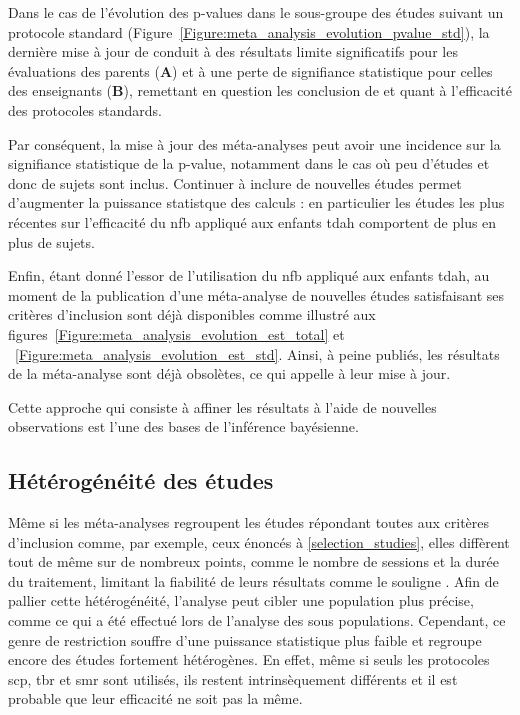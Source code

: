 Dans le cas de l'évolution des p-values dans le sous-groupe des études suivant un protocole standard (Figure~\ref{Figure:meta_analysis_evolution_pvalue_std}), la dernière mise à jour 
de \citet{Cortese2016} conduit à des résultats limite significatifs pour les évaluations des parents (\textbf{A}) et à une perte de signifiance statistique pour celles des 
enseignants (\textbf{B}), remettant en question les conclusion de \citet{Cortese2016} et \citet{Bussalb2019clinical} quant à l'efficacité des protocoles standards.

Par conséquent, la mise à jour des méta-analyses peut avoir une incidence sur la signifiance statistique de la p-value, notamment dans le cas où peu d'études et donc de sujets
sont inclus. Continuer à inclure de nouvelles études permet d'augmenter la puissance statistque des calculs : en particulier les études les plus récentes sur l'efficacité du \gls{nfb}
appliqué aux enfants \gls{tdah} comportent de plus en plus de sujets.

Enfin, étant donné l'essor de l'utilisation du \gls{nfb} appliqué aux enfants \gls{tdah}, au moment de la publication d'une méta-analyse de nouvelles études satisfaisant ses critères d'inclusion
sont déjà disponibles comme illustré aux figures~\ref{Figure:meta_analysis_evolution_est_total} et ~\ref{Figure:meta_analysis_evolution_est_std}. Ainsi, à peine publiés, les résultats de la 
méta-analyse sont déjà obsolètes, ce qui appelle à leur mise à jour. 

Cette approche qui consiste à affiner les résultats à l'aide de nouvelles observations est l'une des bases de l'inférence bayésienne.

\subsection{Hétérogénéité des études} 

Même si les méta-analyses regroupent les études répondant toutes aux critères d'inclusion comme, par exemple, ceux énoncés à \ref{selection_studies}, 
elles diffèrent tout de même sur de nombreux points, comme le nombre de sessions et la durée du traitement, limitant la fiabilité de leurs résultats 
comme le souligne \citep{Alkoby2017}. Afin de pallier 
cette hétérogénéité, l'analyse peut cibler une population plus précise, comme ce qui a été effectué lors de l'analyse
des sous populations. Cependant, ce genre de restriction souffre d'une puissance statistique plus faible et regroupe encore des études fortement hétérogènes.
En effet, même si seuls les protocoles \gls{scp}, \gls{tbr} et \gls{smr} sont utilisés, ils restent intrinsèquement différents et il est probable que leur
efficacité ne soit pas la même. 

